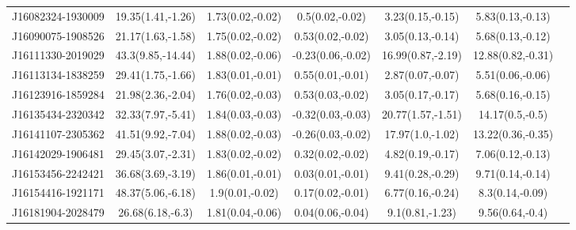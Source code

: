 \begin{longtable}{lcccccc}
J16082324-1930009 & 19.35(1.41,-1.26) & 1.73(0.02,-0.02) &   0.5(0.02,-0.02) &  3.23(0.15,-0.15) &  5.83(0.13,-0.13) \\
J16090075-1908526 & 21.17(1.63,-1.58) & 1.75(0.02,-0.02) &  0.53(0.02,-0.02) &  3.05(0.13,-0.14) &  5.68(0.13,-0.12) \\
J16111330-2019029 & 43.3(9.85,-14.44) & 1.88(0.02,-0.06) & -0.23(0.06,-0.02) & 16.99(0.87,-2.19) & 12.88(0.82,-0.31) \\
J16113134-1838259 & 29.41(1.75,-1.66) & 1.83(0.01,-0.01) &  0.55(0.01,-0.01) &  2.87(0.07,-0.07) &  5.51(0.06,-0.06) \\
J16123916-1859284 & 21.98(2.36,-2.04) & 1.76(0.02,-0.03) &  0.53(0.03,-0.02) &  3.05(0.17,-0.17) &  5.68(0.16,-0.15) \\
J16135434-2320342 & 32.33(7.97,-5.41) & 1.84(0.03,-0.03) & -0.32(0.03,-0.03) & 20.77(1.57,-1.51) &   14.17(0.5,-0.5) \\
J16141107-2305362 & 41.51(9.92,-7.04) & 1.88(0.02,-0.03) & -0.26(0.03,-0.02) &  17.97(1.0,-1.02) & 13.22(0.36,-0.35) \\
J16142029-1906481 & 29.45(3.07,-2.31) & 1.83(0.02,-0.02) &  0.32(0.02,-0.02) &  4.82(0.19,-0.17) &  7.06(0.12,-0.13) \\
J16153456-2242421 & 36.68(3.69,-3.19) & 1.86(0.01,-0.01) &  0.03(0.01,-0.01) &  9.41(0.28,-0.29) &  9.71(0.14,-0.14) \\
J16154416-1921171 & 48.37(5.06,-6.18) &  1.9(0.01,-0.02) &  0.17(0.02,-0.01) &  6.77(0.16,-0.24) &   8.3(0.14,-0.09) \\
J16181904-2028479 &  26.68(6.18,-6.3) & 1.81(0.04,-0.06) &  0.04(0.06,-0.04) &   9.1(0.81,-1.23) &   9.56(0.64,-0.4) \\
\end{longtable}
